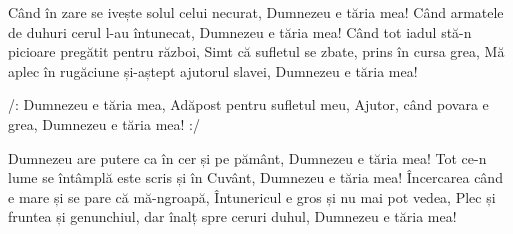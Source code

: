 \beginverse
Când în zare se ivește solul celui necurat,
Dumnezeu e tăria mea!
Când armatele de duhuri cerul l-au întunecat,
Dumnezeu e tăria mea!
Când tot iadul stă-n picioare pregătit pentru război,
Simt că sufletul se zbate, prins în cursa grea,
Mă aplec în rugăciune și-aștept ajutorul slavei,
Dumnezeu e tăria mea!
\endverse

\beginchorus
/: Dumnezeu e tăria mea,
Adăpost pentru sufletul meu,
Ajutor, când povara e grea,
Dumnezeu e tăria mea! :/
\endchorus

\beginverse
Dumnezeu are putere ca în cer și pe pământ,
Dumnezeu e tăria mea!
Tot ce-n lume se întâmplă este scris și în Cuvânt,
Dumnezeu e tăria mea!
Încercarea când e mare și se pare că mă-ngroapă,
Întunericul e gros și nu mai pot vedea,
Plec și fruntea și genunchiul, dar înalț spre ceruri duhul,
Dumnezeu e tăria mea!
\endverse
\endsong